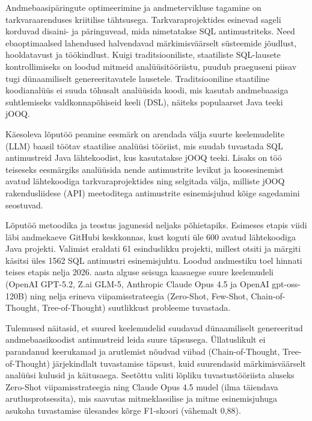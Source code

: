 Andmebaasipäringute optimeerimine ja andmetervikluse tagamine on tarkvaraarenduses kriitilise tähtsusega. Tarkvaraprojektides esinevad sageli korduvad disaini- ja päringuvead, mida nimetatakse SQL antimustriteks. Need ebaoptimaalsed lahendused halvendavad märkimisväärselt süsteemide jõudlust, hooldatavust ja töökindlust. Kuigi traditsiooniliste, staatiliste SQL-lausete kontrollimiseks on loodud mitmeid analüüsitööriistu, puudub praeguseni piisav tugi dünaamiliselt genereeritavatele lausetele. Traditsiooniline staatiline koodianalüüs ei suuda tõhusalt analüüsida koodi, mis kasutab andmebaasiga suhtlemiseks valdkonnapõhiseid keeli (DSL), näiteks populaarset Java teeki jOOQ.

Käesoleva lõputöö peamine eesmärk on arendada välja suurte keelemudelite (LLM) baasil töötav staatilise analüüsi tööriist, mis suudab tuvastada SQL antimustreid Java lähtekoodist, kus kasutatakse jOOQ teeki. Lisaks on töö teiseseks eesmärgiks analüüsida nende antimustrite levikut ja koosesinemist avatud lähtekoodiga tarkvaraprojektides ning selgitada välja, milliste jOOQ rakendusliidese (API) meetoditega antimustrite esinemisjuhud kõige sagedamini seostuvad.

Lõputöö metoodika ja teostus jagunesid neljaks põhietapiks. Esimeses etapis viidi läbi andmekaeve GitHubi keskkonnas, kust koguti üle \num{600} avatud lähtekoodiga Java projekti. Valimist eraldati \num{61} esinduslikku projekti, millest otsiti ja märgiti käsitsi üles \num{1562} SQL antimustri esinemisjuhtu. Loodud andmestiku toel hinnati teises etapis nelja 2026. aasta alguse seisuga kaasaegse suure keelemudeli (OpenAI GPT-5.2, Z.ai GLM-5, Anthropic Claude Opus 4.5 ja OpenAI \mbox{gpt-oss-120B}) ning nelja erineva viipamisstrateegia (Zero-Shot, Few-Shot, Chain-of-Thought, Tree-of-Thought) suutlikkust probleeme tuvastada.

Tulemused näitasid, et suured keelemudelid suudavad dünaamiliselt genereeritud andmebaasikoodist antimustreid leida suure täpsusega. Üllatuslikult ei parandanud keerukamad ja arutlemist nõudvad viibad (Chain-of-Thought, Tree-of-Thought) järjekindlalt tuvastamise täpsust, kuid suurendasid märkimisväärselt analüüsi kulusid ja käitusaega. Seetõttu valiti lõpliku tuvastustööriista aluseks Zero-Shot viipamisstrateegia ning Claude Opus 4.5 mudel (ilma täiendava arutlusprotsessita), mis saavutas mitmeklassilise ja mitme esinemisjuhuga asukoha tuvastamise ülesandes kõrge F1-skoori (vähemalt 0,88).

